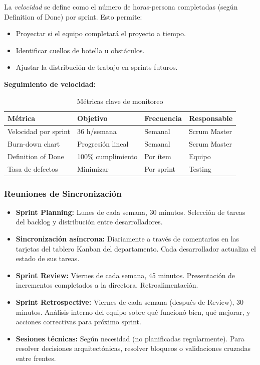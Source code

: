 \documentclass{article}
\begin{document}
La \textit{velocidad} se define como el número de horas-persona completadas (según Definition of Done) por sprint. Esto permite:

\begin{itemize}
    \item Proyectar si el equipo completará el proyecto a tiempo.
    \item Identificar cuellos de botella u obstáculos.
    \item Ajustar la distribución de trabajo en sprints futuros.
\end{itemize}

\textbf{Seguimiento de velocidad:}

\begin{table}[H]
\centering
\small
\begin{tabular}{|p{3.5cm}|p{2.5cm}|p{2cm}|p{2cm}|}
\hline
\textbf{Métrica} & \textbf{Objetivo} & \textbf{Frecuencia} & \textbf{Responsable} \\
\hline
Velocidad por sprint & 36 h/semana & Semanal & Scrum Master \\
\hline
Burn-down chart & Progresión lineal & Semanal & Scrum Master \\
\hline
Definition of Done & 100\% cumplimiento & Por ítem & Equipo \\
\hline
Tasa de defectos & Minimizar & Por sprint & Testing \\
\hline
\end{tabular}
\caption{Métricas clave de monitoreo}
\label{tab:metricas}
\end{table}

\subsubsection{Reuniones de Sincronización}

\begin{itemize}
    \item \textbf{Sprint Planning:} Lunes de cada semana, 30 minutos. Selección de tareas del backlog y distribución entre desarrolladores.
    
    \item \textbf{Sincronización asíncrona:} Diariamente a través de comentarios en las tarjetas del tablero Kanban del departamento. Cada desarrollador actualiza el estado de sus tareas.
    
    \item \textbf{Sprint Review:} Viernes de cada semana, 45 minutos. Presentación de incrementos completados a la directora. Retroalimentación.
    
    \item \textbf{Sprint Retrospective:} Viernes de cada semana (después de Review), 30 minutos. Análisis interno del equipo sobre qué funcionó bien, qué mejorar, y acciones correctivas para próximo sprint.
    
    \item \textbf{Sesiones técnicas:} Según necesidad (no planificadas regularmente). Para resolver decisiones arquitectónicas, resolver bloqueos o validaciones cruzadas entre frentes.
\end{itemize}
\end{document}
